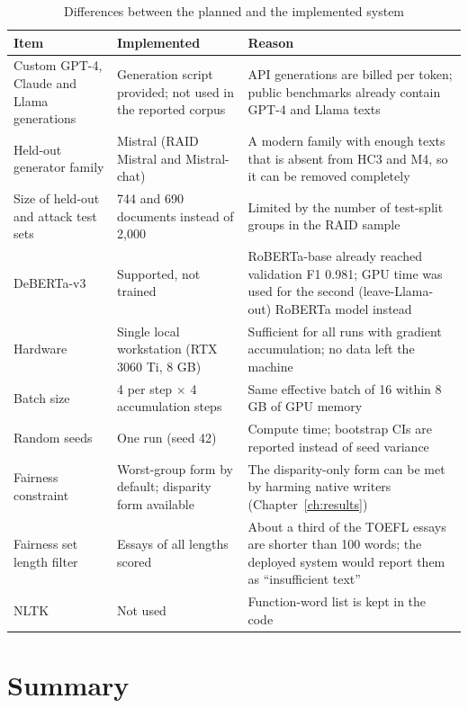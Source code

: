\begin{table}[H]
\caption{Differences between the planned and the implemented system}
\label{tab:deviations}
\centering
\small
\begin{tabularx}{\textwidth}{|p{3.4cm}|p{4.2cm}|L|}
\hline
\textbf{Item} & \textbf{Implemented} & \textbf{Reason} \\ \hline
Custom GPT-4, Claude and Llama generations & Generation script provided; not used in the reported corpus & API generations are billed per token; public benchmarks already contain GPT-4 and Llama texts \\ \hline
Held-out generator family & Mistral (RAID Mistral and Mistral-chat) & A modern family with enough texts that is absent from HC3 and M4, so it can be removed completely \\ \hline
Size of held-out and attack test sets & 744 and 690 documents instead of 2,000 & Limited by the number of test-split groups in the RAID sample \\ \hline
DeBERTa-v3 & Supported, not trained & RoBERTa-base already reached validation F1 0.981; GPU time was used for the second (leave-Llama-out) RoBERTa model instead \\ \hline
Hardware & Single local workstation (RTX 3060 Ti, 8 GB) & Sufficient for all runs with gradient accumulation; no data left the machine \\ \hline
Batch size & 4 per step $\times$ 4 accumulation steps & Same effective batch of 16 within 8 GB of GPU memory \\ \hline
Random seeds & One run (seed 42) & Compute time; bootstrap CIs are reported instead of seed variance \\ \hline
Fairness constraint & Worst-group form by default; disparity form available & The disparity-only form can be met by harming native writers (Chapter~\ref{ch:results}) \\ \hline
Fairness set length filter & Essays of all lengths scored & About a third of the TOEFL essays are shorter than 100 words; the deployed system would report them as ``insufficient text'' \\ \hline
NLTK & Not used & Function-word list is kept in the code \\ \hline
\end{tabularx}
\end{table}

\section{Summary}

